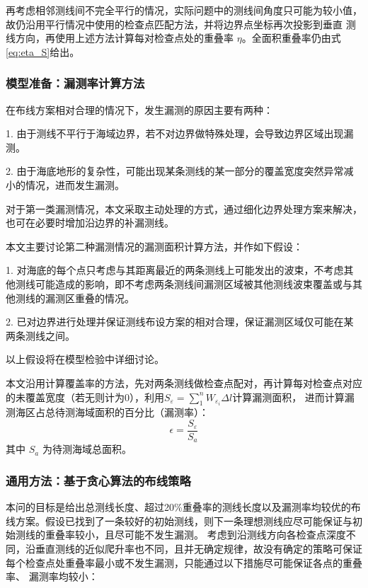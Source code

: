 \documentclass[withoutpreface,bwprint]{cumcmthesis} %
\begin{document}
        再考虑相邻测线间不完全平行的情况，实际问题中的测线间角度只可能为较小值，故仍沿用平行情况中使用的检查点匹配方法，并将边界点坐标再次投影到垂直
        测线方向，再使用上述方法计算每对检查点处的重叠率 $\eta$。全面积重叠率仍由式\cref{eq:eta_S}给出。
 
        \subsubsection{模型准备：漏测率计算方法}
        在布线方案相对合理的情况下，发生漏测的原因主要有两种：

        1. 由于测线不平行于海域边界，若不对边界做特殊处理，会导致边界区域出现漏测。

        2. 由于海底地形的复杂性，可能出现某条测线的某一部分的覆盖宽度突然异常减小的情况，进而发生漏测。
        
        对于第一类漏测情况，本文采取主动处理的方式，通过细化边界处理方案来解决，也可在必要时增加沿边界的补漏测线。

        本文主要讨论第二种漏测情况的漏测面积计算方法，并作如下假设：

        1. 对海底的每个点只考虑与其距离最近的两条测线上可能发出的波束，不考虑其他测线可能造成的影响，即不考虑两条测线间漏测区域被其他测线波束覆盖或与其他测线的漏测区重叠的情况。

        2. 已对边界进行处理并保证测线布设方案的相对合理，保证漏测区域仅可能在某两条测线之间。

        以上假设将在模型检验中详细讨论。

        本文沿用计算覆盖率的方法，先对两条测线做检查点配对，再计算每对检查点对应的未覆盖宽度（若无则计为0），利用$S_{\varepsilon} = \sum_{1}^{n} W_{\varepsilon_i} \Delta l$计算漏测面积，
        进而计算漏测海区占总待测海域面积的百分比（漏测率）：
        \begin{equation}
            \epsilon = \frac{S_\varepsilon}{S_{a}}
            \label{epsilon}
        \end{equation}
        其中 $S_a$ 为待测海域总面积。

        \subsubsection{通用方法：基于贪心算法的布线策略}
        本问的目标是给出总测线长度、超过20\%重叠率的测线长度以及漏测率均较优的布线方案。假设已找到了一条较好的初始测线，则下一条理想测线应尽可能保证与初始测线的重叠率较小，且尽可能不发生漏测。
        考虑到沿测线方向各检查点深度不同，沿垂直测线的近似爬升率也不同，且并无确定规律，故没有确定的策略可保证每个检查点处重叠率最小或不发生漏测，只能通过以下措施尽可能保证各点的重叠率、
        漏测率均较小：
\end{document}
